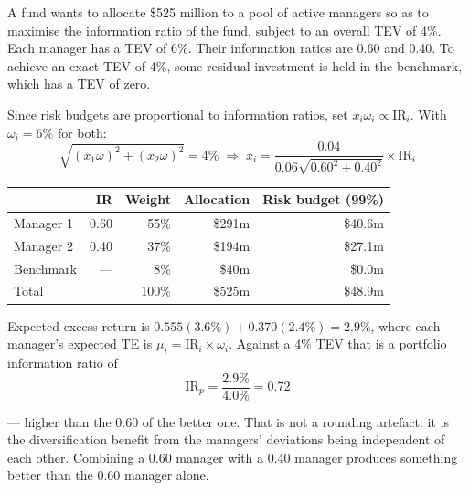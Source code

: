 \begin{imexbox}[title={Allocating \$525 million across two active managers}]
A fund wants to allocate \$525 million to a pool of active managers so as to
maximise the information ratio of the fund, subject to an overall TEV of 4\%.
Each manager has a TEV of 6\%. Their information ratios are 0.60 and 0.40. To
achieve an exact TEV of 4\%, some residual investment is held in the benchmark,
which has a TEV of zero.

\medskip
Since risk budgets are proportional to information ratios, set
$x_i \omega_i \propto \text{IR}_i$. With $\omega_i = 6\%$ for both:
\[ \sqrt{(x_1\omega)^2 + (x_2\omega)^2} = 4\%
   \;\Longrightarrow\;
   x_i = \frac{0.04}{0.06\sqrt{0.60^2 + 0.40^2}} \times \text{IR}_i \]
\begin{center}\small
\begin{tabular}{@{}lrrrr@{}}
\toprule
& IR & Weight & Allocation & Risk budget (99\%) \\
\midrule
Manager 1 & 0.60 & 55\% & \$291m & \$40.6m \\
Manager 2 & 0.40 & 37\% & \$194m & \$27.1m \\
Benchmark & --- & \phantom{0}8\% & \$40m & \$0.0m \\
\midrule
Total & & 100\% & \$525m & \$48.9m \\
\bottomrule
\end{tabular}
\end{center}
\medskip
Expected excess return is $0.555(3.6\%) + 0.370(2.4\%) = 2.9\%$, where each
manager's expected TE is $\mu_i = \text{IR}_i \times \omega_i$. Against a 4\% TEV
that is a portfolio information ratio of
\[ \text{IR}_p = \frac{2.9\%}{4.0\%} = \mathbf{0.72} \]
\end{imexbox}

\begin{imkeybox}[title={The result worth remembering}]
--- higher than the 0.60 of the better one. That is not a rounding artefact: it
is the diversification benefit from the managers' deviations being independent of
each other. Combining a 0.60 manager with a 0.40 manager produces something
better than the 0.60 manager alone.
\end{imkeybox}

